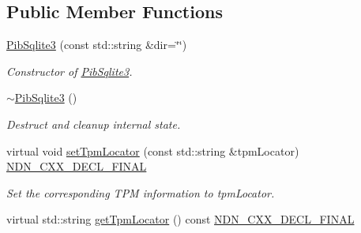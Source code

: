 \subsection*{Public Member Functions}
\begin{DoxyCompactItemize}
\item 
\hyperlink{classndn_1_1security_1_1PibSqlite3_a094206b96e4f04979e70a3d6418c8989}{Pib\+Sqlite3} (const std\+::string \&dir=\char`\"{}\char`\"{})
\begin{DoxyCompactList}\small\item\em Constructor of \hyperlink{classndn_1_1security_1_1PibSqlite3}{Pib\+Sqlite3}. \end{DoxyCompactList}\item 
\hyperlink{classndn_1_1security_1_1PibSqlite3_a978ec080bfe0c12608e01afc42dd0fad}{$\sim$\+Pib\+Sqlite3} ()\hypertarget{classndn_1_1security_1_1PibSqlite3_a978ec080bfe0c12608e01afc42dd0fad}{}\label{classndn_1_1security_1_1PibSqlite3_a978ec080bfe0c12608e01afc42dd0fad}

\begin{DoxyCompactList}\small\item\em Destruct and cleanup internal state. \end{DoxyCompactList}\item 
virtual void \hyperlink{classndn_1_1security_1_1PibSqlite3_a4fbc2f03f27dde7564431f0fdf81d670}{set\+Tpm\+Locator} (const std\+::string \&tpm\+Locator) \hyperlink{ndn-cxx_2src_2common_8hpp_ab53a383abb72682805543301b5f2c244}{N\+D\+N\+\_\+\+C\+X\+X\+\_\+\+D\+E\+C\+L\+\_\+\+F\+I\+N\+AL}
\begin{DoxyCompactList}\small\item\em Set the corresponding T\+PM information to {\ttfamily tpm\+Locator}. \end{DoxyCompactList}\item 
virtual std\+::string \hyperlink{classndn_1_1security_1_1PibSqlite3_ac96cfe5ae293c1799fe4442045f14f96}{get\+Tpm\+Locator} () const \hyperlink{ndn-cxx_2src_2common_8hpp_ab53a383abb72682805543301b5f2c244}{N\+D\+N\+\_\+\+C\+X\+X\+\_\+\+D\+E\+C\+L\+\_\+\+F\+I\+N\+AL}\hypertarget{classndn_1_1security_1_1PibSqlite3_ac96cfe5ae293c1799fe4442045f14f96}{}\label{classndn_1_1security_1_1PibSqlite3_ac96cfe5ae293c1799fe4442045f14f96}


\end{DoxyCompactItemize}
